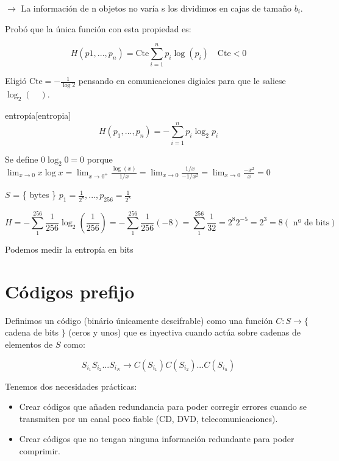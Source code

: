 	$\rightarrow$ La información de n objetos no varía s los dividimos en cajas de tamaño $b_i$.

	Probó que la única función con esta propiedad es:

	$$H(p1, ..., p_n) = \text{Cte} \sum^{n}_{i=1} p_i \log(p_i) \quad \text{Cte} < 0 $$

	Eligió $\text{Cte} = -\frac{1}{\log 2}$ pensando en comunicaciones digiales para que le saliese $\log_2 ( \quad) $.

	\begin{defn}{entropía}[entropia]
		$$H(p_1, ..., p_n) = -\sum^{n}_{i = 1} p_i \log_2 p_i $$

		Se define $0 \log_2 0 = 0$ porque $\lim_{x \rightarrow 0} x \log x = \lim_{x \rightarrow 0^+} \frac{\log(x)}{1/x} = \lim_{x \rightarrow 0} \frac{1/x}{-1 / x^2} = \lim_{x \rightarrow 0} \frac{-x^2}{x} = 0$
	\end{defn}

	\begin{example}

		$S$ = \{ bytes \}  $p_1 = \frac{1}{2^8}, ..., p_{256} = \frac{1}{2^8}$

		$$  H = - \sum_{1}^{256} \frac{1}{256} \log_2 (\frac{1}{256}) = - \sum_{1}^{256} \frac{1}{256} (-8) = \sum_{1}^{256} \frac{1}{32} = 2^8 2^{-5} = 2^3 = 8 (\text{ nº de bits}) $$

	\end{example}

	\begin{obs}
		Podemos medir la entropía en bits
	\end{obs}

\section{Códigos prefijo}

	\begin{defn}[código]
		Definimos un código (binário únicamente descifrable) como una función $C: S \rightarrow \{ $ cadena de bits $ \} $ (ceros y unos) que es inyectiva cuando actúa sobre cadenas de elementos de $S$ como:

		$$ S_{i_1} S_{i_2} ... S_{i_N} \rightarrow C(S_{i_1}) C(S_{i_2}) ... C(S_{i_n}) $$

	\end{defn}

	Tenemos dos necesidades prácticas:

	\begin{itemize}
		\item Crear códigos que añaden redundancia para poder corregir errores cuando se transmiten por un canal poco fiable (CD, DVD, telecomunicaciones).

		\item Crear códigos que no tengan ninguna información redundante para poder comprimir.
	\end{itemize}

